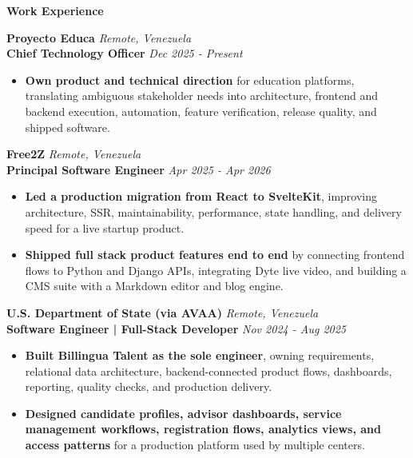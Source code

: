 \documentclass[10pt]{article}
\begin{document}
\vspace{4pt}
\begin{center}
    \textbf{Work Experience}
\end{center}
\vspace{-6pt}

\textbf{Proyecto Educa} \hfill \textit{Remote, Venezuela} \\
\textbf{Chief Technology Officer} \hfill \textit{Dec 2025 - Present}
\begin{itemize}
    \item \textbf{Own product and technical direction} for education platforms, translating ambiguous stakeholder needs into architecture, frontend and backend execution, automation, feature verification, release quality, and shipped software.
\end{itemize}

\vspace{3pt}
\textbf{Free2Z} \hfill \textit{Remote, Venezuela} \\
\textbf{Principal Software Engineer} \hfill \textit{Apr 2025 - Apr 2026}
\begin{itemize}
    \item \textbf{Led a production migration from React to SvelteKit}, improving architecture, SSR, maintainability, performance, state handling, and delivery speed for a live startup product.
    \item \textbf{Shipped full stack product features end to end} by connecting frontend flows to Python and Django APIs, integrating Dyte live video, and building a CMS suite with a Markdown editor and blog engine.
\end{itemize}

\vspace{3pt}
\textbf{U.S. Department of State (via AVAA)} \hfill \textit{Remote, Venezuela} \\
\textbf{Software Engineer | Full-Stack Developer} \hfill \textit{Nov 2024 - Aug 2025}
\begin{itemize}
    \item \textbf{Built Billingua Talent as the sole engineer}, owning requirements, relational data architecture, backend-connected product flows, dashboards, reporting, quality checks, and production delivery.
    \item \textbf{Designed candidate profiles, advisor dashboards, service management workflows, registration flows, analytics views, and access patterns} for a production platform used by multiple centers.
\end{itemize}
\end{document}
